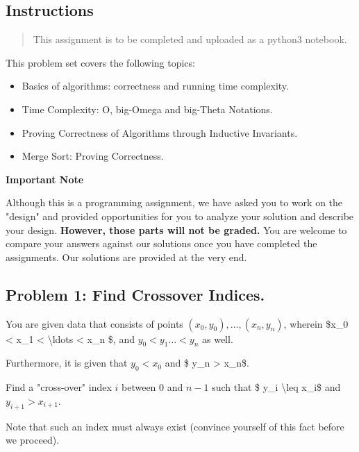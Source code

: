 \documentclass[
]{article}
\author{}
\date{}
\providecommand{\tightlist}{%
  \setlength{\itemsep}{0pt}\setlength{\parskip}{0pt}}
\begin{document}
\hypertarget{instructions}{%
\subsection{Instructions}\label{instructions}}

\begin{quote}
This assignment is to be completed and uploaded as a python3 notebook.
\end{quote}

This problem set covers the following topics:

\begin{itemize}
\tightlist
\item
  Basics of algorithms: correctness and running time complexity.
\item
  Time Complexity: O, big-Omega and big-Theta Notations.
\item
  Proving Correctness of Algorithms through Inductive Invariants.
\item
  Merge Sort: Proving Correctness.
\end{itemize}

\textbf{Important Note}

Although this is a programming assignment, we have asked you to work on
the "design" and provided opportunities for you to analyze your solution
and describe your design. \textbf{However, those parts will not be
graded.} You are welcome to compare your answers against our solutions
once you have completed the assignments. Our solutions are provided at
the very end.

\hypertarget{problem-1-find-crossover-indices}{%
\subsection{Problem 1: Find Crossover
Indices.}\label{problem-1-find-crossover-indices}}

You are given data that consists of points
\((x_0, y_0), \ldots, (x_n, y_n)\), wherein \$x\_0 \textless{} x\_1
\textless{} \textbackslash ldots \textless{} x\_n \$, and
\(y_0 < y_1 \ldots < y_n\) as well.

Furthermore, it is given that \(y_0 < x_0\) and \$ y\_n \textgreater{}
x\_n\$.

Find a "cross-over" index \(i\) between \(0\) and \(n-1\) such that \$
y\_i \textbackslash leq x\_i\$ and \(y_{i+1} > x_{i+1}\).

Note that such an index must always exist (convince yourself of this
fact before we proceed).
\end{document}

